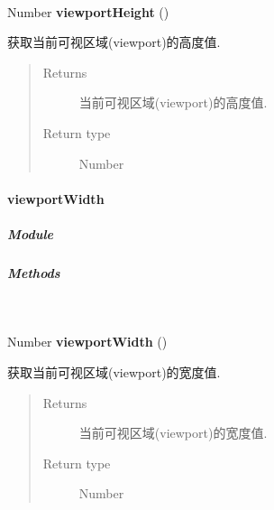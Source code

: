 \documentclass[letterpaper,10pt,english]{sphinxmanual}
\begin{document}
\begin{fulllineitems}
\label{api/core/dom/viewportHeight:DOM.viewportHeight}~
\begin{DUlineblock}{0em}
\item[] Number \textbf{viewportHeight} ()
\item[] 获取当前可视区域(viewport)的高度值.
\end{DUlineblock}
\begin{quote}\begin{description}
\item[{Returns}] \leavevmode
当前可视区域(viewport)的高度值.

\item[{Return type}] \leavevmode
Number

\end{description}\end{quote}

\end{fulllineitems}



\paragraph{viewportWidth}
\label{api/core/dom/viewportWidth::doc}\label{api/core/dom/viewportWidth:viewportwidth}

\subparagraph{Module}
\label{api/core/dom/viewportWidth:module}\begin{quote}

{\hyperref[api/core/dom/index:module-DOM]{}}
\end{quote}


\subparagraph{Methods}
\label{api/core/dom/viewportWidth:methods}

\begin{fulllineitems}
\label{api/core/dom/viewportWidth:DOM.viewportWidth}~
\begin{DUlineblock}{0em}
\item[] Number \textbf{viewportWidth} ()
\item[] 获取当前可视区域(viewport)的宽度值.
\end{DUlineblock}
\begin{quote}\begin{description}
\item[{Returns}] \leavevmode
当前可视区域(viewport)的宽度值.

\item[{Return type}] \leavevmode
Number

\end{description}\end{quote}

\end{fulllineitems}
\end{document}
